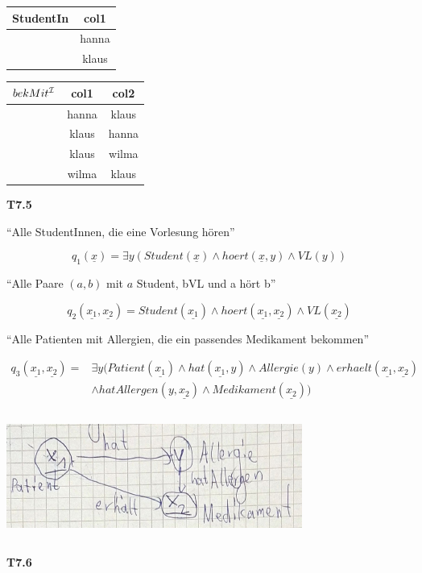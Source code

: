 \begin{tabular}{c | c}
StudentIn & col1 \\ \hline
 & hanna \\
 & klaus
\end{tabular}

\begin{tabular}{c | c | c}
$bekMit^{\mathcal{I}}$ & col1 & col2 \\ \hline
 & hanna & klaus\\
 & klaus & hanna\\
 & klaus & wilma \\
 & wilma & klaus
\end{tabular}

\textbf{T7.5}

"`Alle StudentInnen, die eine Vorlesung hören"'

$$q_1(\underline{x}) = \exists y (Student(\underline{x}) \wedge hoert(\underline{x},y) \wedge VL(y))$$

"`Alle Paare $(a,b)$ mit $a$ Student, bVL und a hört b"'

$$q_2(\underline{x_1},\underline{x_2}) = Student(\underline{x_1}) \wedge hoert(\underline{x_1},\underline{x_2}) \wedge VL(\underline{x_2})$$

"`Alle Patienten mit Allergien, die ein passendes Medikament bekommen"'

\begin{equation}
\begin{split}
q_3(\underline{x_1}, \underline{x_2}) =& \exists y (Patient(\underline{x_1}) \wedge hat(\underline{x_1},y) \wedge Allergie(y) \wedge erhaelt(\underline{x_1},\underline{x_2}) \\
& \wedge hatAllergen(y,\underline{x_2}) \wedge Medikament(\underline{x_2}))
\end{split}
\end{equation}

\includegraphics[width=3.81910in,height=1.63200in]{media/75logic.png}

\textbf{T7.6}

